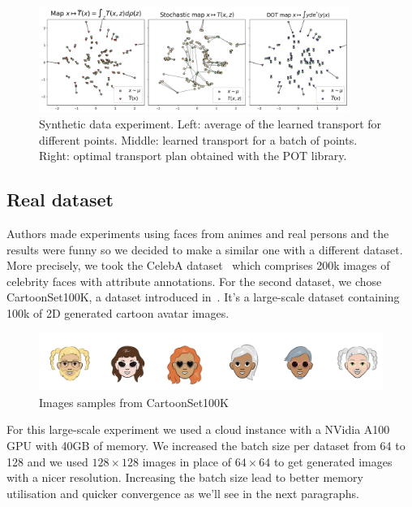 \documentclass[11pt]{article}
\begin{document}
\begin{figure}[H]
    \centering
    \includegraphics[width=0.9\textwidth]{figures/toy_2.png}
    \caption{Synthetic data experiment. Left: average of the learned transport for different points. Middle: learned transport for a batch of points. Right: optimal transport plan obtained with the POT library.}
    \label{fig:toy_2}
\end{figure}

\subsection{Real dataset}

Authors made experiments using faces from animes and real persons and the results were funny so we decided to make a similar one with a different dataset. More precisely, we took the CelebA dataset~\cite{celeba_dataset} which comprises 200k images of celebrity faces with attribute annotations. For the second dataset, we chose CartoonSet100K, a dataset introduced in~\cite{cartoonset_dataset}. It's a large-scale dataset containing 100k of 2D generated cartoon avatar images.

\begin{figure}[h!]
    \centering
    \includegraphics[scale=.2]{figures/cartoonset-excerpt.png}
    \caption{Images samples from CartoonSet100K}
\end{figure}

For this large-scale experiment we used a cloud instance with a NVidia A100 GPU with 40GB of memory. We increased the batch size per dataset from 64 to 128 and we used $128\times128$ images in place of $64\times64$ to get generated images with a nicer resolution. Increasing the batch size lead to better memory utilisation and quicker convergence as we'll see in the next paragraphs.
\end{document}
